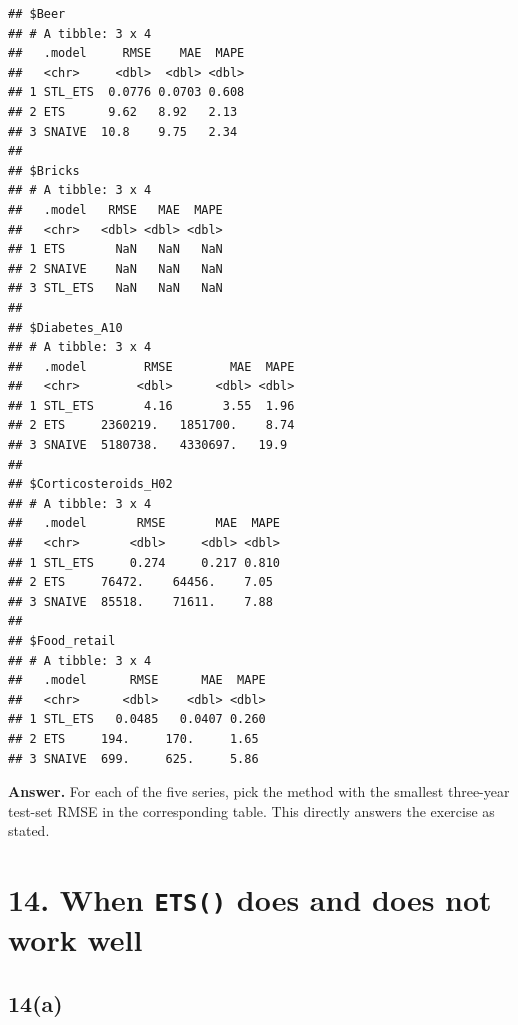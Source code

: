 \documentclass[
  11pt,
]{article}
\begin{document}
\begin{verbatim}
## $Beer
## # A tibble: 3 x 4
##   .model     RMSE    MAE  MAPE
##   <chr>     <dbl>  <dbl> <dbl>
## 1 STL_ETS  0.0776 0.0703 0.608
## 2 ETS      9.62   8.92   2.13 
## 3 SNAIVE  10.8    9.75   2.34 
## 
## $Bricks
## # A tibble: 3 x 4
##   .model   RMSE   MAE  MAPE
##   <chr>   <dbl> <dbl> <dbl>
## 1 ETS       NaN   NaN   NaN
## 2 SNAIVE    NaN   NaN   NaN
## 3 STL_ETS   NaN   NaN   NaN
## 
## $Diabetes_A10
## # A tibble: 3 x 4
##   .model        RMSE        MAE  MAPE
##   <chr>        <dbl>      <dbl> <dbl>
## 1 STL_ETS       4.16       3.55  1.96
## 2 ETS     2360219.   1851700.    8.74
## 3 SNAIVE  5180738.   4330697.   19.9 
## 
## $Corticosteroids_H02
## # A tibble: 3 x 4
##   .model       RMSE       MAE  MAPE
##   <chr>       <dbl>     <dbl> <dbl>
## 1 STL_ETS     0.274     0.217 0.810
## 2 ETS     76472.    64456.    7.05 
## 3 SNAIVE  85518.    71611.    7.88 
## 
## $Food_retail
## # A tibble: 3 x 4
##   .model      RMSE      MAE  MAPE
##   <chr>      <dbl>    <dbl> <dbl>
## 1 STL_ETS   0.0485   0.0407 0.260
## 2 ETS     194.     170.     1.65 
## 3 SNAIVE  699.     625.     5.86
\end{verbatim}

\textbf{Answer.} For each of the five series, pick the method with the
smallest three-year test-set RMSE in the corresponding table. This
directly answers the exercise as stated.

\section{\texorpdfstring{14. When \texttt{ETS()} does and does not work
well}{14. When ETS() does and does not work well}}\label{when-ets-does-and-does-not-work-well}

\subsection{14(a)}\label{a-5}
\end{document}

